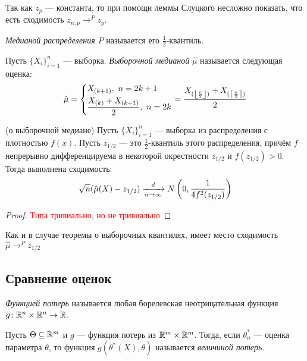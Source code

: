 \begin{note}
	Так как $z_p$ --- константа, то при помощи леммы Слуцкого несложно показать, что есть сходимость $z_{n, p} \to^P z_p$.
\end{note}

\begin{definition}
	\textit{Медианой распределения $P$} называется его $\frac{1}{2}$-квантиль.
\end{definition}

\begin{definition}
	Пусть $\{X_i\}_{i = 1}^n$ --- выборка. \textit{Выборочной медианой} $\hat{\mu}$ называется следующая оценка:
	\[
		\hat{\mu} = \left\{\begin{aligned}
			&{X_{(k + 1)},\ n = 2k + 1}
			\\
			&{\frac{X_{(k)} + X_{(k + 1)}}{2},\ n = 2k}
		\end{aligned}\right. = \frac{X_{(\left\lfloor\frac{n}{2}\right\rfloor)} + X_{(\left\lceil\frac{n}{2}\right\rceil)}}{2}
	\]
\end{definition}

\begin{theorem} (о выборочной медиане)
	Пусть $\{X_i\}_{i = 1}^n$ --- выборка из распределения с плотностью $f(x)$. Пусть $z_{1 / 2}$ --- это $\frac{1}{2}$-квантиль этого распределения, причём $f$ непрерывно дифференцируема в некоторой окрестности $z_{1 / 2}$ и $f(z_{1 / 2}) > 0$. Тогда выполнена сходимость:
	\[
		\sqrt{n}(\hat{\mu}(X) - z_{1 / 2}) \xrightarrow[n \to \infty]{d} N\left(0, \frac{1}{4f^2(z_{1 / 2})}\right)
	\]
\end{theorem}

\begin{proof}
	\textcolor{red}{Типа тривиально, но не тривиально}
\end{proof}

\begin{note}
	Как и в случае теоремы о выборочных квантилях, имеет место сходимость $\hat{\mu} \to^P z_{1 / 2}$
\end{note}

\subsection{Сравнение оценок}

\begin{definition}
	\textit{Функцией потерь} называется любая борелевская неотрицательная функция $g \colon \mathbb{R}^n \times \mathbb{R}^n \to \mathbb{R}$.
\end{definition}

\begin{definition}
	Пусть $\Theta \subseteq \mathbb{R}^m$ и $g$ --- функция потерь из $\mathbb{R}^m \times \mathbb{R}^m$. Тогда, если $\theta_n^*$ --- оценка параметра $\theta$, то функция $g(\theta^*(X), \theta)$ называется \textit{величиной потерь}.
\end{definition}

